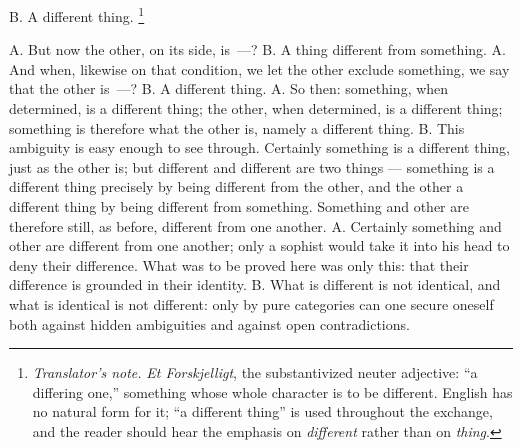\documentclass[12pt,a4paper]{book}
\renewcommand{\thefootnote}{\ifcase\value{footnote}\or *)\or **)\or ***)\fi}
\newcommand{\tnote}[1]{%
  \begingroup
  \renewcommand{\thefootnote}{\textdagger}%
  \footnote{\emph{Translator's note.} #1}%
  \addtocounter{footnote}{-1}%
  \endgroup}
\begin{document}
B. A different thing.\tnote{\emph{Et Forskjelligt}, the substantivized neuter
adjective: ``a differing one,'' something whose whole character is to be
different. English has no natural form for it; ``a different thing'' is used
throughout the exchange, and the reader should hear the emphasis on
\emph{different} rather than on \emph{thing}.} A. But now the other, on its
side, is~---? B. A thing different from something. A. And when, likewise on
that condition, we let the other exclude something, we say that the other
is~---? B. A different thing. A. So then: something, when determined, is a
different thing; the other, when determined, is a different thing; something is
therefore what the other is, namely a different thing. B. This ambiguity is
easy enough to see through. Certainly
something is a different thing, just as the other is; but different and
different are two things --- something is a different thing precisely by being
different from the other, and the other a different thing by being different
from something. Something and other are therefore still, as before, different
from one another. A. Certainly something and other are different from one
another; only a sophist would take it into his head to deny their difference.
What was to be proved here was only this: that their difference is grounded in
their identity. B. What is different is not identical, and what is identical is
not different: only by pure categories can one secure oneself both against
hidden ambiguities and against open contradictions.
\end{document}
